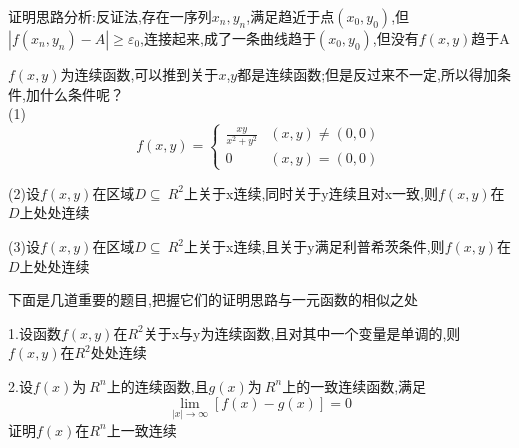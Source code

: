 \documentclass{ctexart}
\begin{document}
     证明思路分析:反证法,存在一序列${x_{n},y_{n}}$,满足趋近于点$\left(x_{0},y_{0} \right) $,但$\left|f(x_{n},y_{n})-A\right|\ge \varepsilon_{0} $,连接起来,成了一条曲线趋于$(x_{0},y_{0})$,但没有$f(x,y)$趋于A
     \begin{tcolorbox}[title = {二元函数的连续性},colbacktitle=green!35!black,colback=green!1,arc = 2mm, outer arc = 2mm,fonttitle = \itshape, fontupper = \itshape, fontlower = \itshape] 
     $f(x,y)$为连续函数,可以推到关于$x$,$y$都是连续函数;但是反过来不一定,所以得加条件,加什么条件呢？\\
     (1)$$f(x,y)=\begin{cases}
     	\displaystyle {\frac{xy}{x^{2}+y^{2}}} &(x,y)\ne(0,0)\\
     	0&(x,y)=(0,0)
     	
     \end{cases}$$
 
      (2)设$f(x,y)$在区域$D \subseteq  \ R^{2}$上关于x连续,同时关于y连续且对x一致,则$f(x,y)$在$D$上处处连续
     
      (3)设$f(x,y)$在区域$D \subseteq  \ R^{2}$上关于x连续,且关于y满足利普希茨条件,则$f(x,y)$在$D$上处处连续
    \end{tcolorbox}
下面是几道重要的题目,把握它们的证明思路与一元函数的相似之处
\begin{tcolorbox}[title = {几道关于多元函数的题目},colbacktitle=red!35!white,colback=white,arc = 1mm, outer arc = 1mm,fonttitle = \itshape, fontupper = \itshape, fontlower = \itshape]
	 1.设函数$f(x,y)$在$R^{2}$关于x与y为连续函数,且对其中一个变量是单调的,则$f(x,y)$在$R^{2}$处处连续
	 
	 2.设$f(x)$为$\ R^{n}$上的连续函数,且$g(x)$为$\ R^{n}$上的一致连续函数,满足$$\lim\limits_{\left|x \right|  \to \infty}\left[f(x)-g(x) \right] =0$$
	 证明$f(x)$在$R^{n}$上一致连续
\end{tcolorbox}
\end{document}
